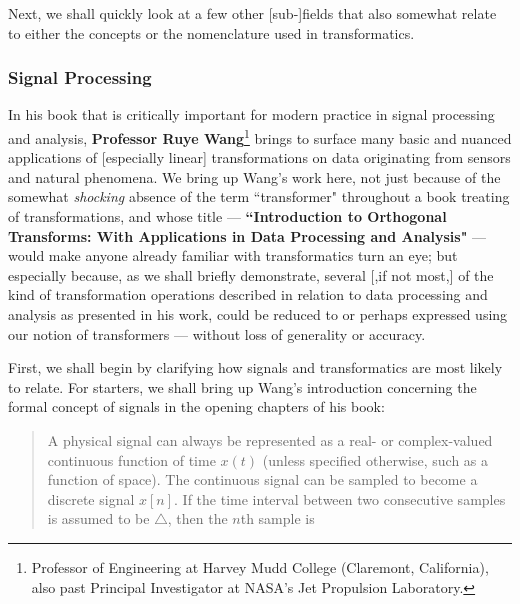 \documentclass[a4paper, 18pt]{book} %
\begin{document}
\begin{appendices}
Next, we shall quickly look at a few other [sub-]fields that also somewhat relate to either the concepts or the nomenclature used in transformatics. 


\vspace{2em}

\subsubsection{Signal Processing}

In his book\cite{Wang2012} that is critically important for modern practice in signal processing and analysis, \textbf{Professor Ruye Wang}\footnote{Professor of Engineering at Harvey Mudd College (Claremont, California), also past Principal Investigator at NASA's Jet Propulsion Laboratory.} brings to surface many basic and nuanced applications of [especially linear] transformations on data originating from sensors and natural phenomena. We bring up Wang's work here, not just because of the somewhat \textit{shocking} absence of the term ``transformer" throughout a book treating of transformations, and whose title --- \textbf{``Introduction to Orthogonal Transforms: With Applications in Data Processing and Analysis"} --- would make anyone already familiar with transformatics turn an eye; but especially because, as we shall briefly demonstrate, several [,if not most,] of the kind of transformation operations described in relation to data processing and analysis as presented in his work, could be reduced to or perhaps expressed using our notion of transformers --- without loss of generality or accuracy.


\vspace{2em}

First, we shall begin by clarifying how signals and transformatics are most likely to relate. For starters, we shall bring up Wang's introduction concerning the formal concept of signals in the opening chapters of his book:


\noindent
\begin{minipage}{1\textwidth}
\vspace{1em}
\begin{quotation}
{\ttfamily

A physical signal can always be represented as a real- or complex-valued continuous function of time $x(t)$ (unless specified otherwise, such as a function of space). The continuous signal can be sampled to become a discrete signal $x[n]$. If the time interval between two consecutive samples is assumed to be $\triangle$, then the $n$th sample is\\

}
\end{quotation}
\end{minipage}
\end{appendices}
\end{document}
